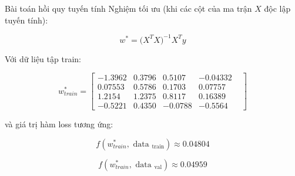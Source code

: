 \documentclass[10pt]{beamer}
\theoremstyle{remark}
\theoremstyle{definition}
\begin{document}
\begin{frame}[allowframebreaks]{Bài toán hồi quy tuyến tính}
	\framebreak
	Nghiệm tối ưu (khi các cột của ma trận $X$ độc lập tuyến tính):

	\begin{equation*}
		w^{*} = \Big(X^T X \Big)^{-1}X^T y
	\end{equation*}

	Với dữ liệu tập train:

	\begin{equation*}
		w_{train}^{*} = \begin{bmatrix} -1.3962 &  0.3796 & 0.5107 & -0.04332 &\\ 0.07553 & 0.5786 & 0.1703 & 0.07757 &\\ 1.2154  & 1.2375 &  0.8117  & 0.16389 &\\ -0.5221 &  0.4350 & -0.0788 & -0.5564 \end{bmatrix}
	\end{equation*}

	và giá trị hàm loss tương ứng:

	\begin{equation*}
		f(w_{train}^{*}, \text{ data }_{\text{train}}) \approx 0.04804
	\end{equation*}

	\begin{equation*}
		f(w_{train}^{*}, \text{ data }_{\text{val}}) \approx 0.04959
	\end{equation*}

\end{frame}
\end{document}
